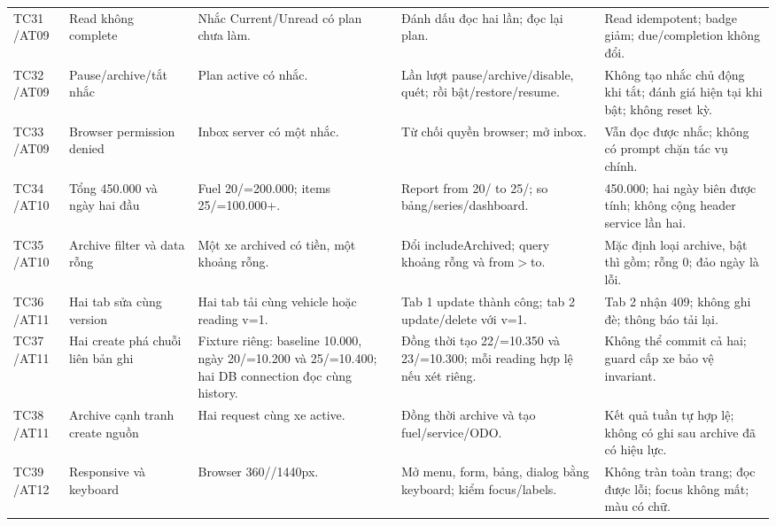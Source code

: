 \begin{smalltable}
\begin{longtable}{L{1.2cm}L{2.5cm}L{3.6cm}L{3.6cm}L{3.7cm}}
TC31 /\allowbreak  AT09 & Read không complete & Nhắc Current/\allowbreak Unread có plan chưa làm. & Đánh dấu đọc hai lần; đọc lại plan. & Read idempotent; badge giảm; due/\allowbreak completion không đổi.\\
TC32 /\allowbreak  AT09 & Pause/\allowbreak archive/\allowbreak tắt nhắc & Plan active có nhắc. & Lần lượt pause/\allowbreak archive/\allowbreak disable,  quét; rồi bật/\allowbreak restore/\allowbreak resume. & Không tạo nhắc chủ động khi tắt; đánh giá hiện tại khi bật; không reset kỳ.\\
TC33 /\allowbreak  AT09 & Browser permission denied & Inbox server có một nhắc. & Từ chối quyền browser; mở inbox. & Vẫn đọc được nhắc; không có prompt chặn tác vụ chính.\\
TC34 /\allowbreak  AT10 & Tổng 450.000 và ngày hai đầu & Fuel 20/=200.000; items 25/=100.000+. & Report from 20/ to 25/; so bảng/\allowbreak series/\allowbreak dashboard. & 450.000; hai ngày biên được tính; không cộng header service lần hai.\\
TC35 /\allowbreak  AT10 & Archive filter và data rỗng & Một xe archived có tiền,  một khoảng rỗng. & Đổi includeArchived; query khoảng rỗng và from$>$to. & Mặc định loại archive,  bật thì gồm; rỗng 0; đảo ngày là lỗi.\\
TC36 /\allowbreak  AT11 & Hai tab sửa cùng version & Hai tab tải cùng vehicle hoặc reading v=1. & Tab 1 update thành công; tab 2 update/\allowbreak delete với v=1. & Tab 2 nhận 409; không ghi đè; thông báo tải lại.\\
TC37 /\allowbreak  AT11 & Hai create phá chuỗi liên bản ghi & Fixture riêng: baseline 10.000, ngày 20/=10.200 và 25/=10.400; hai DB connection đọc cùng history. & Đồng thời tạo 22/=10.350 và 23/=10.300; mỗi reading hợp lệ nếu xét riêng. & Không thể commit cả hai; guard cấp xe bảo vệ invariant.\\
TC38 /\allowbreak  AT11 & Archive cạnh tranh create nguồn & Hai request cùng xe active. & Đồng thời archive và tạo fuel/\allowbreak service/\allowbreak ODO. & Kết quả tuần tự hợp lệ; không có ghi sau archive đã có hiệu lực.\\
TC39 /\allowbreak  AT12 & Responsive và keyboard & Browser 360//\allowbreak 1440px. & Mở menu,  form,  bảng,  dialog bằng keyboard; kiểm focus/\allowbreak labels. & Không tràn toàn trang; đọc được lỗi; focus không mất; màu có chữ.\\

\end{longtable}
\end{smalltable}
